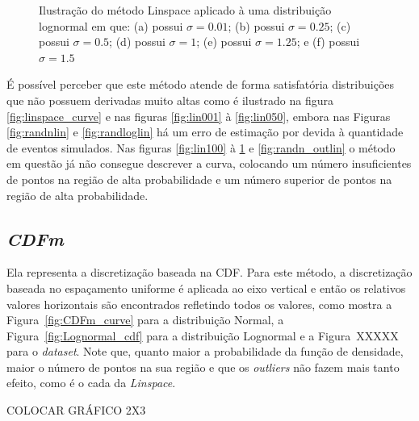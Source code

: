 \begin{figure}[H]
\begin{subfigure}[b]{0.3\textwidth}
		\caption{}
		\label{fig:lin150}
	\end{subfigure}
\caption{Ilustração do método Linspace aplicado à uma distribuição lognormal em que: (a) possui $\sigma = 0.01$; (b) possui $\sigma = 0.25$; (c) possui $\sigma = 0.5$; (d) possui $\sigma = 1$; (e) possui $\sigma = 1.25$; e (f) possui $\sigma = 1.5$}
\label{fig:Lognormal_lin}
\end{figure}


É possível perceber que este método atende de forma satisfatória distribuições que não possuem derivadas muito altas como é ilustrado na figura \ref{fig:linspace_curve} e nas figuras \ref{fig:lin001} à \ref{fig:lin050}, embora nas Figuras \ref{fig:randnlin} e \ref{fig:randloglin} há um erro de estimação por devida à quantidade de eventos simulados. Nas figuras \ref{fig:lin100} à \ref{fig:lin150} e \ref{fig:randn_outlin} o método em questão já não consegue descrever a curva, colocando um número insuficientes de pontos na região de alta probabilidade e um número superior de pontos na região de alta probabilidade.

\subsection{\textit{CDFm}}
Ela representa a discretização baseada na \ac{CDF}. Para este método, a discretização baseada no espaçamento uniforme é aplicada ao eixo vertical e então os relativos valores horizontais são encontrados refletindo todos os valores, como mostra a Figura~\ref{fig:CDFm_curve} para a distribuição Normal, a Figura~\ref{fig:Lognormal_cdf} para a distribuição Lognormal e a Figura~XXXXX para o \textit{dataset}. Note que, quanto maior a probabilidade da função de densidade, maior o número de pontos na sua região e que os \textit{outliers} não fazem mais tanto efeito, como é o cada da \textit{Linspace}.

\color{red} COLOCAR GRÁFICO 2X3 \color{black}

